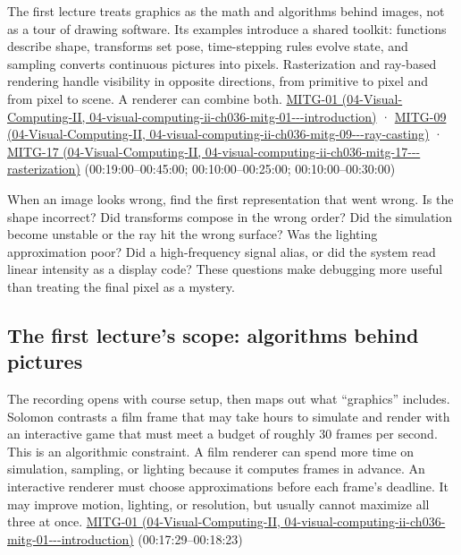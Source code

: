 The first lecture treats graphics as the math and algorithms behind images, not as a tour of drawing software. Its examples introduce a shared toolkit: functions describe shape, transforms set pose, time-stepping rules evolve state, and sampling converts continuous pictures into pixels. Rasterization and ray-based rendering handle visibility in opposite directions, from primitive to pixel and from pixel to scene. A renderer can combine both. \href{../04-Visual-Computing-II/main.pdf\#nameddest=04-visual-computing-ii-ch036-mitg-01---introduction}{MITG-01 (04-Visual-Computing-II, 04-visual-computing-ii-ch036-mitg-01-\/-\/-introduction)} · \href{../04-Visual-Computing-II/main.pdf\#nameddest=04-visual-computing-ii-ch036-mitg-09---ray-casting}{MITG-09 (04-Visual-Computing-II, 04-visual-computing-ii-ch036-mitg-09-\/-\/-ray-casting)} · \href{../04-Visual-Computing-II/main.pdf\#nameddest=04-visual-computing-ii-ch036-mitg-17---rasterization}{MITG-17 (04-Visual-Computing-II, 04-visual-computing-ii-ch036-mitg-17-\/-\/-rasterization)} (00:19:00--00:45:00; 00:10:00--00:25:00; 00:10:00--00:30:00)

When an image looks wrong, find the first representation that went wrong. Is the shape incorrect? Did transforms compose in the wrong order? Did the simulation become unstable or the ray hit the wrong surface? Was the lighting approximation poor? Did a high-frequency signal alias, or did the system read linear intensity as a display code? These questions make debugging more useful than treating the final pixel as a mystery.

\subsection{The first lecture's scope: algorithms behind pictures}\label{03-visual-computing-i-ch001-the-first-lectures-scope-algorithms-behind-pictures}

The recording opens with course setup, then maps out what ``graphics'' includes. Solomon contrasts a film frame that may take hours to simulate and render with an interactive game that must meet a budget of roughly 30 frames per second. This is an algorithmic constraint. A film renderer can spend more time on simulation, sampling, or lighting because it computes frames in advance. An interactive renderer must choose approximations before each frame's deadline. It may improve motion, lighting, or resolution, but usually cannot maximize all three at once. \href{../04-Visual-Computing-II/main.pdf\#nameddest=04-visual-computing-ii-ch036-mitg-01---introduction}{MITG-01 (04-Visual-Computing-II, 04-visual-computing-ii-ch036-mitg-01-\/-\/-introduction)} (00:17:29--00:18:23)

